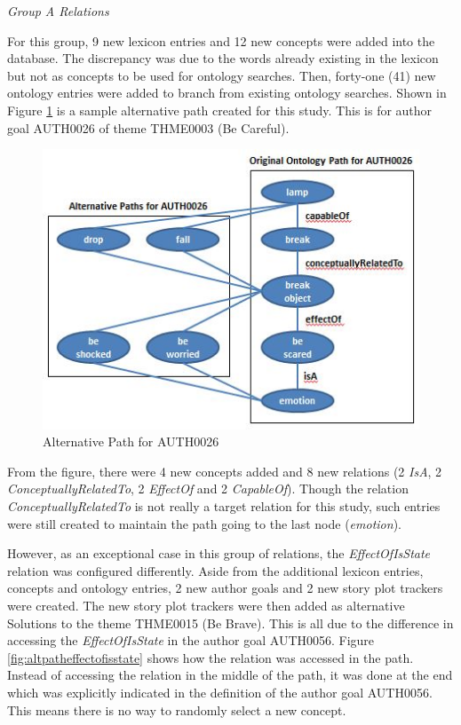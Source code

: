 \emph{Group A Relations}

For this group, 9 new lexicon entries and 12 new concepts were added into the database. The discrepancy was due to the words already existing in the lexicon but not as concepts to be used for ontology searches. Then, forty-one (41) new ontology entries were added to branch from existing ontology searches. Shown in Figure \ref{fig:altpath} is a sample alternative path created for this study. This is for author goal AUTH0026 of theme THME0003 (Be Careful).

\begin{figure}[h]                %
   \centering                    %
   \includegraphics{altpath.jpg}      %
   \caption{Alternative Path for AUTH0026}
    \label{fig:altpath}
\end{figure}

From the figure, there were 4 new concepts added and 8 new relations (2 \textit{IsA}, 2 \textit{ConceptuallyRelatedTo}, 2 \textit{EffectOf} and 2  \textit{CapableOf}). Though the relation \textit{ConceptuallyRelatedTo} is not really a target relation for this study, such entries were still created to maintain the path going to the last node (\textit{emotion}). 

However, as an exceptional case in this group of relations, the \textit{EffectOfIsState} relation was configured differently. Aside from the additional lexicon entries, concepts and ontology entries, 2 new author goals and 2 new story plot trackers were created. The new story plot trackers were then added as alternative Solutions to the theme THME0015 (Be Brave). This is all due to the difference in accessing the \textit{EffectOfIsState} in the author goal AUTH0056. Figure \ref{fig:altpatheffectofisstate} shows how the relation was accessed in the path. Instead of accessing the relation in the middle of the path, it was done at the end which was explicitly indicated in the definition of the author goal AUTH0056. This means there is no way to randomly select a new concept. 


